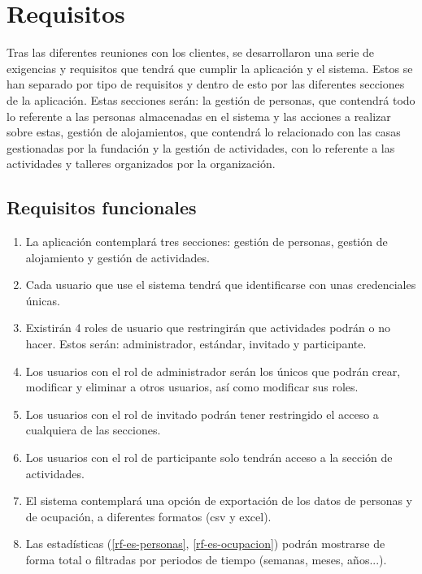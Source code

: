 
\section{Requisitos}

Tras las diferentes reuniones con los clientes, se desarrollaron una serie de exigencias y requisitos que tendrá que cumplir la aplicación y el sistema. Estos se han separado por tipo de requisitos y dentro de esto por las diferentes secciones de la aplicación. Estas secciones serán: la gestión de personas, que contendrá todo lo referente a las personas almacenadas en el sistema y las acciones a realizar sobre estas, gestión de alojamientos, que contendrá lo relacionado con las casas gestionadas por la fundación y la gestión de actividades, con lo referente a las actividades y talleres organizados por la organización.  

\subsection{Requisitos funcionales}

\begin{enumerate}[start=1,label={RF-\arabic*.}]

    \item La aplicación contemplará tres secciones: gestión de personas, gestión de alojamiento y gestión de actividades.
    \item Cada usuario que use el sistema tendrá que identificarse con unas credenciales únicas.
    \item Existirán 4 roles de usuario que restringirán que actividades podrán o no hacer. Estos serán: administrador, estándar, invitado y participante.
    \item Los usuarios con el rol de administrador serán los únicos que podrán crear, modificar y eliminar a otros usuarios, así como modificar sus roles.
    \item Los usuarios con el rol de invitado podrán tener restringido el acceso a cualquiera de las secciones.
    \item Los usuarios con el rol de participante solo tendrán acceso a la sección de actividades.
    \item El sistema contemplará una opción de exportación de los datos de personas y de ocupación, a diferentes formatos (csv y excel).
    \item Las estadísticas (\ref{rf-es-personas}, \ref{rf-es-ocupacion}) podrán mostrarse de forma total o filtradas por periodos de tiempo (semanas, meses, años...).

\end{enumerate}

